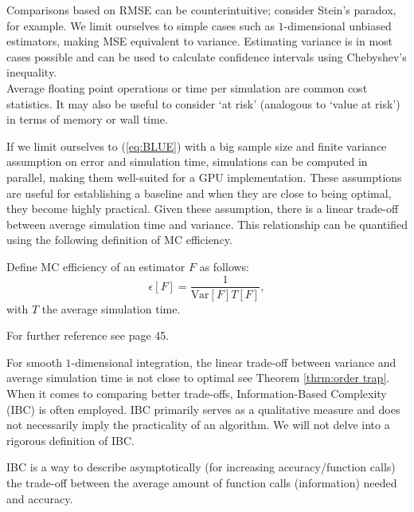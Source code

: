 \documentclass[a4paper,12pt]{article}
\begin{document}
Comparisons based on RMSE can be counterintuitive; consider Stein's paradox,
for example. We limit ourselves to simple cases such as $1$-dimensional
unbiased estimators, making MSE equivalent to variance.
Estimating variance is in most cases possible and can be used to calculate
confidence intervals using Chebyshev's inequality.\\

Average floating point operations or time per simulation are common cost statistics.
It may also be useful to consider \enquote*{at risk}  (analogous to \enquote*{value at risk})
in terms of memory or wall time.

If we limit ourselves to (\ref{eq:BLUE}) with a big sample size and
finite variance assumption on error and simulation time,
simulations can be computed in parallel, making them well-suited for a GPU implementation.
These assumptions are useful for establishing a baseline and
when they are close to being optimal, they become highly practical.
Given these assumption, there is a linear trade-off
between average simulation time and variance. This relationship can be quantified
using the following definition of MC efficiency.

\begin{definition}
  Define MC efficiency of an
  estimator $F$ as follows:
  \begin{equation}
    \epsilon[F]=\frac{1}{\text{Var}[F] T[F]},
  \end{equation}
  with $T$ the average simulation time.
\end{definition}

\begin{related}
  For further reference see \cite{veach_robust_1997} page 45.
\end{related}

For smooth $1$-dimensional integration, the linear trade-off between
variance and average simulation time is not close to optimal see
Theorem \ref{thrm:order trap}. \\
When it comes to comparing better trade-offs,
Information-Based Complexity (IBC) is often employed.
IBC primarily serves as a
qualitative measure and does not necessarily imply the
practicality of an algorithm. We will not delve into a
rigorous definition of IBC.

\begin{definition}
  IBC is a way to describe asymptotically (for increasing accuracy/function calls)
  the trade-off between the average amount of function calls (information)
  needed and accuracy.
\end{definition}
\end{document}
